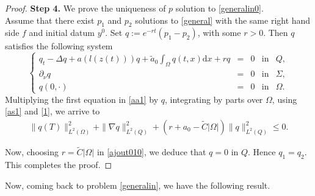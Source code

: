 \documentclass[reqno,twoside]{amsart}
\numberwithin{equation}{section}
\theoremstyle{definition}
\newtheorem{definition}[theorem]{Definition}
\numberwithin{equation}{section}
\def \dis {\displaystyle}
\def \dx{\mathrm{d}x}
\begin{document}
\begin{proof}
\noindent \textbf{Step 4.} We prove the uniqueness of $p$ solution to \eqref{generalin0}.\\
Assume that there exist $p_1$ and $p_2$ solutions to \eqref{general} with the same right hand side $f$ and initial datum $y^0$.  Set $q:=e^{-rt}(p_1-p_2)$, with some $r>0$. Then  $q$ satisfies the following system
\begin{equation}\label{aa10}
	\left\{
	\begin{array}{rllll}
		\dis q_{t}-\Delta q+a\left(l(z(t))\right)q+\tilde{a}_0\int_{\Omega}q(t,x)\dx +rq &=&0& \mbox{in}& Q,\\
		\dis  \partial_\nu q&=&0& \mbox{in}& \Sigma, \\
		\dis  q(0,\cdot)&=&0 &\mbox{in}&\Omega.
	\end{array}
	\right.
\end{equation}
Multiplying the first equation in \eqref{aa1} by $q$, integrating by parts over $\Omega$, using \eqref{as1} and \eqref{1}, we arrive to
\begin{equation}\label{ajout010}
	\begin{array}{rllll}
		\dis \|q(T)\|^2_{L^2(\Omega)}+\|\nabla q\|^2_{L^2(Q)}+ (r+a_0-\tilde{C}|\Omega|)\|q\|^2_{L^2(Q)}
		\leq 0.
	\end{array}
\end{equation}

Now, choosing $r=\tilde{C}|\Omega|$ in \eqref{ajout010}, we deduce that
$q=0$ in $Q$. Hence $q_1=q_2$. This completes the proof.

\end{proof}
Now, coming back to  problem \eqref{generalin}, we have the following result.
\end{document}
